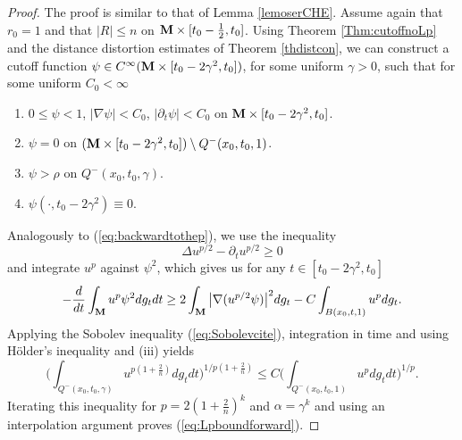 \documentclass[11pt]{amsart}
\numberwithin{equation}{section}
\def\M{{\bf M}}
\numberwithin{equation}{section}
\begin{document}
\begin{proof}
The proof is similar to that of Lemma \ref{lemoserCHE}.
Assume again that $r_0 = 1$ and that $|R| \leq n$ on $\M \times [t_0 - \frac12, t_0]$.
Using Theorem \ref{Thm:cutoffnoLp} and the distance distortion estimates of Theorem \ref{thdistcon}, we can construct a cutoff function $\psi \in C^\infty ( \M \times [t_0 - 2 \gamma^2, t_0] )$, for some uniform $\gamma > 0$, such that for some uniform $C_0 < \infty$
\begin{enumerate}[label=(\roman*)]
\item $0 \leq \psi < 1$, $| \nabla \psi | < C_0$, $| \partial_t \psi | < C_0$ on $\M \times [t_0 - 2 \gamma^2, t_0]$.
\item $\psi = 0$ on $( \M \times [t_0 - 2 \gamma^2, t_0 ] ) \setminus Q^- (x_0, t_0, 1)$.
\item $\psi > \rho$ on $Q^- (x_0, t_0, \gamma)$.
\item $\psi (\cdot, t_0 - 2\gamma^2) \equiv 0$.
\end{enumerate}
Analogously to (\ref{eq:backwardtothep}), we use the inequality
\begin{equation} \label{eq:forwardtothep}
 \Delta u^{p/2} - \partial_t u^{p/2} \geq 0
\end{equation}
and integrate $u^p$ against $\psi^2$, which gives us for any $t \in [t_0 - 2 \gamma^2, t_0]$
\begin{equation} \label{eq:dtintegralforward}
 - \frac{d}{dt} \int_{\M} u^p \psi^2 dg_t dt \geq 2 \int_{\M} \big| \nabla ( u^{p/2} \psi ) \big|^2 dg_t - C \int_{B(x_0, t, 1)} u^p dg_t. 
\end{equation}
Applying the Sobolev inequality (\ref{eq:Sobolevcite}), integration in time and using H\"older's inequality and (iii) yields
\[ \bigg( \int_{Q^- (x_0, t_0, \gamma)} u^{p (1+ \frac2n)} dg_t dt \bigg)^{1/p(1+ \frac2n)} \leq C \bigg( \int_{Q^- (x_0, t_0, 1)} u^p dg_t dt \bigg)^{1/p}. \]
Iterating this inequality for $p = 2 (1+ \frac2n )^k$ and $\alpha = \gamma^k$ and using an interpolation argument proves (\ref{eq:Lpboundforward}).


\end{proof}
\end{document}
